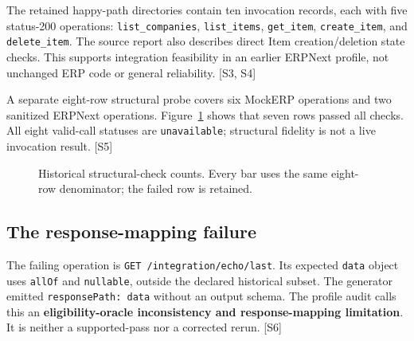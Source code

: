 The retained happy-path directories contain ten invocation records, each with five status-200 operations: \texttt{list\_companies}, \texttt{list\_items}, \texttt{get\_item}, \texttt{create\_item}, and \texttt{delete\_item}. The source report also describes direct Item creation/deletion state checks. This supports integration feasibility in an earlier ERPNext profile, not unchanged ERP code or general reliability. [S3, S4]

A separate eight-row structural probe covers six MockERP operations and two sanitized ERPNext operations. Figure~\ref{fig:transform} shows that seven rows passed all checks. All eight valid-call statuses are \texttt{unavailable}; structural fidelity is not a live invocation result. [S5]

\begin{figure}[h]\centering\caption{Historical structural-check counts. Every bar uses the same eight-row denominator; the failed row is retained.}\label{fig:transform}\end{figure}

\subsection*{The response-mapping failure}
The failing operation is \texttt{GET /integration/echo/last}. Its expected \texttt{data} object uses \texttt{allOf} and \texttt{nullable}, outside the declared historical subset. The generator emitted \texttt{responsePath: data} without an output schema. The profile audit calls this an \textbf{eligibility-oracle inconsistency and response-mapping limitation}. It is neither a supported-pass nor a corrected rerun. [S6]


